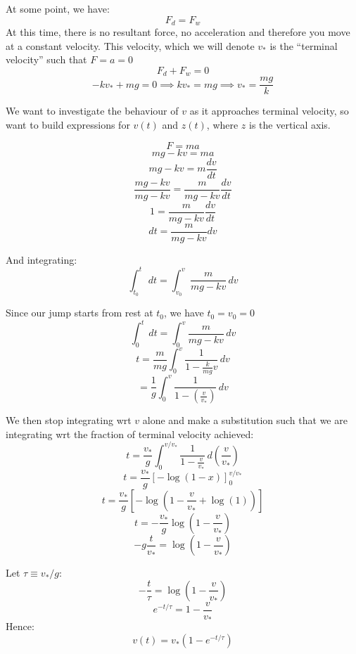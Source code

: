 At some point, we have:
\[
    F_d = F_w
\]
At this time, there is no resultant force, no acceleration and therefore you move at a constant velocity. This velocity, which we will denote $v_*$ is the ``terminal velocity'' such that $F = a = 0$
\[
    F_d + F_w = 0
\]
\[
    -k v_* + mg = 0 \implies k v_* = mg \implies v_* = \frac{mg}{k}
\]

We want to investigate the behaviour of $v$ as it approaches terminal velocity, so want to build expressions for $v(t)$ and $z(t)$, where $z$ is the vertical axis.

\[
    F = ma
\]
\[
    mg - kv = ma
\]
\[
    mg - kv = m \frac{dv}{dt}
\]
\[
    \frac{mg - kv}{mg - kv} = \frac{m}{mg - kv} \frac{dv}{dt}
\]
\[
1 = \frac{m}{mg - kv} \frac{dv}{dt}
\]
\[
    dt = \frac{m}{mg - kv} dv
\]

And integrating:
\[
    \int_{t_0}^{t} \, dt = \int_{v_0}^{v} \frac{m}{mg - kv} \, dv
\]

Since our jump starts from rest at $t_0$, we have $t_0 = v_0 = 0$
\[
    \int_{0}^{t} \, dt = \int_{0}^{v} \frac{m}{mg - kv} \, dv
\]
\[
    t = \frac{m}{mg} \int_{0}^{v} \frac{1}{1 - \frac{k}{mg}v} \, dv
\]
\[
    = \frac{1}{g} \int_{0}^{v} \frac{1}{1 - \left(\frac{v}{v_*}\right)} \, dv
\]

We then stop integrating wrt $v$ alone and make a substitution such that we are integrating wrt the fraction of terminal velocity achieved:
\[
    t = \frac{v_*}{g} \int_{0}^{v/v_*} \frac{1}{1-\frac{v}{v_*}} \, d \left(\frac{v}{v_*}\right)
\]
\[
    t = \frac{v_*}{g} \left[- \log(1 - x)\right]_0^{v/v_*}
\]
\[
    t = \frac{v_*}{g} \left[-\log \left(1 - \frac{v}{v_*} + \log(1)\right)\right]
\]
\[
    t = -\frac{v_*}{g} \log \left(1 - \frac{v}{v_*}\right)
\]
\[
    -g \frac{t}{v_*} = \log \left(1 - \frac{v}{v_*}\right)
\]

Let $\tau \equiv v_* / g$:
\[
    - \frac{t}{\tau} = \log \left(1 - \frac{v}{v_*}\right)
\]
\[
    e^{-t / \tau} = 1 - \frac{v}{v_*}
\]
Hence:
\[
    v(t) = v_* \left(1 - e^{- t / \tau}\right)
\]
